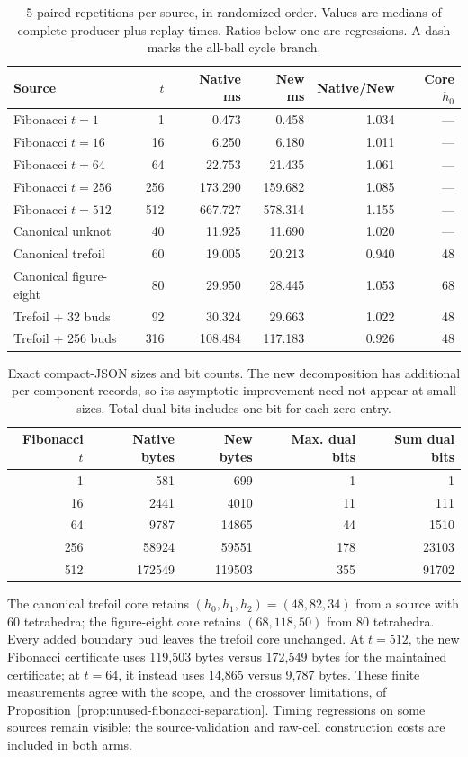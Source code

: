 \begin{table}[htbp]
\centering\small
\begin{tabular}{lrrrrr}
\hline
Source & $t$ & Native ms & New ms & Native/New & Core $h_0$ \\
\hline
Fibonacci $t=1$ & 1 & 0.473 & 0.458 & 1.034 & --- \\
Fibonacci $t=16$ & 16 & 6.250 & 6.180 & 1.011 & --- \\
Fibonacci $t=64$ & 64 & 22.753 & 21.435 & 1.061 & --- \\
Fibonacci $t=256$ & 256 & 173.290 & 159.682 & 1.085 & --- \\
Fibonacci $t=512$ & 512 & 667.727 & 578.314 & 1.155 & --- \\
Canonical unknot & 40 & 11.925 & 11.690 & 1.020 & --- \\
Canonical trefoil & 60 & 19.005 & 20.213 & 0.940 & 48 \\
Canonical figure-eight & 80 & 29.950 & 28.445 & 1.053 & 68 \\
Trefoil + 32 buds & 92 & 30.324 & 29.663 & 1.022 & 48 \\
Trefoil + 256 buds & 316 & 108.484 & 117.183 & 0.926 & 48 \\
\hline
\end{tabular}
\caption{5 paired repetitions per source, in randomized order. Values are medians of complete producer-plus-replay times. Ratios below one are regressions. A dash marks the all-ball cycle branch.}
\label{tab:unused-timings}
\end{table}

\begin{table}[htbp]
\centering\small
\begin{tabular}{rrrrr}
\hline
Fibonacci $t$ & Native bytes & New bytes & Max. dual bits & Sum dual bits \\
\hline
1 & 581 & 699 & 1 & 1 \\
16 & 2441 & 4010 & 11 & 111 \\
64 & 9787 & 14865 & 44 & 1510 \\
256 & 58924 & 59551 & 178 & 23103 \\
512 & 172549 & 119503 & 355 & 91702 \\
\hline
\end{tabular}
\caption{Exact compact-JSON sizes and bit counts. The new decomposition has additional per-component records, so its asymptotic improvement need not appear at small sizes. Total dual bits includes one bit for each zero entry.}
\label{tab:unused-bits}
\end{table}

The canonical trefoil core retains $(h_0,h_1,h_2)=(48,82,34)$ from a source with 60 tetrahedra; the figure-eight core retains $(68,118,50)$ from 80 tetrahedra. Every added boundary bud leaves the trefoil core unchanged. At $t=512$, the new Fibonacci certificate uses 119,503 bytes versus 172,549 bytes for the maintained certificate; at $t=64$, it instead uses 14,865 versus 9,787 bytes. These finite measurements agree with the scope, and the crossover limitations, of Proposition~\ref{prop:unused-fibonacci-separation}. Timing regressions on some sources remain visible; the source-validation and raw-cell construction costs are included in both arms.
